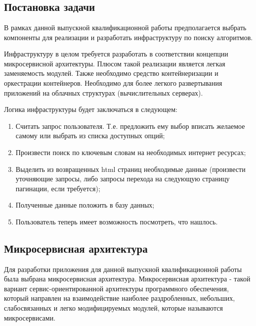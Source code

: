 
\chapter{\centering {}}
\label{cha:ch_1}

\section{Постановка задачи}
В рамках данной выпускной квалификационной работы предполагается выбрать
компоненты для реализации и разработать инфраструктуру по поиску алгоритмов.

Инфраструктуру в целом требуется разработать в соответствии концепции
микросервисной архитектуры. Плюсом такой реализации является легкая заменяемость
модулей. Также необходимо средство контейнеризации и оркестрации контейнеров.
Необходимо для более легкого развертывания приложений на облачных структурах
(вычислительных серверах).

Логика инфраструктуры будет заключаться в следующем:
\begin{enumerate}[label=\arabic*.]
    \item Считать запрос пользователя. Т.е. предложить ему выбор вписать желаемое самому или выбрать из списка доступных опций;
    \item Произвести поиск по ключевым словам на необходимых интернет ресурсах;
    \item Выделить из возвращенных html страниц необходимые данные (произвести уточняющие запросы, либо запросы перехода на следующую страницу пагинации, если требуется);
    \item Полученные данные положить в базу данных;
    \item Пользователь теперь имеет возможность посмотреть, что нашлось.
\end{enumerate}

\section{Микросервисная архитектура}
Для разработки приложения для данной выпускной квалификационной работы была выбрана микросервисная архитектура.
Микросервисная архитектура - такой вариант сервис-ориентированной архитектуры
программного обеспечения, который направлен на взаимодействие наиболее
раздробленных, небольших, слабосвязанных и легко модифицируемых модулей, которые
называются микросервисами.

